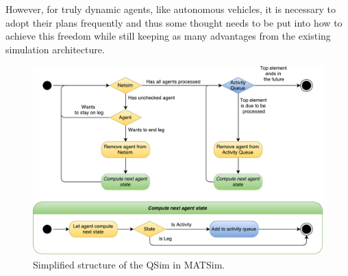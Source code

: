 However, for truly dynamic agents, like autonomous vehicles, it is necessary to
adopt their plans frequently and thus some thought needs to be put into how to
achieve this freedom while still keeping as many advantages from the existing
simulation architecture.

\begin{figure}
    \centering
    \includegraphics[width=1.0\textwidth]{figures/qsim.pdf}
    \caption{Simplified structure of the QSim in MATSim.}
    \label{fig:qsim}
\end{figure}
